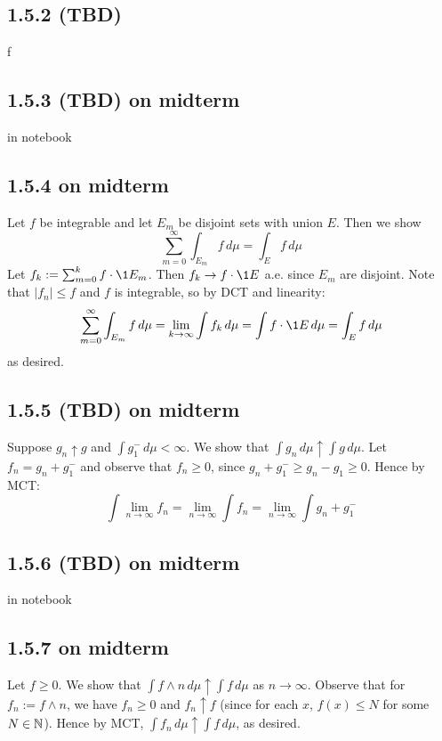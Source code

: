 \documentclass[11pt]{article}
\begin{document}
\subsection*{1.5.2 (TBD)}


f

\subsection*{1.5.3 (TBD) on midterm}


in notebook



\subsection*{1.5.4 on midterm}

Let $f$ be integrable and let $E_m$ be disjoint sets with union $E$. Then we show \[\sum_{m=0}^{\infty} \int_{E_m}f \,d\mu = \int_{E}f \,d\mu \] Let $f_k := \sum_{m=0}^{k} f\cdot \1{E_m}$. Then $f_k \to f \cdot \1{E}$ a.e. since $E_m$ are disjoint. Note that $|f_n| \leq f$ and $f$ is integrable, so by DCT and linearity: \[\sum_{m=0}^{\infty} \int_{E_m}f \,d\mu = \lim_{k\to \infty}\int f_k \,d\mu = \int f \cdot \1{E} \,d\mu=\int_{E}f \,d\mu \] as desired.

\subsection*{1.5.5 (TBD) on midterm}

Suppose $g_n \uparrow g$ and $\int g_1^- \, d\mu < \infty$. We show that $\int g_n \, d\mu \uparrow\int g \, d\mu$. Let $f_n = g_n + g_1^-$ and observe that $f_n \geq 0$, since $g_n + g_1^- \geq g_n - g_1 \geq 0$. Hence by MCT: 
\[\int \lim_{n\to\infty}  f_n = \lim_{n\to\infty} \int f_n = \lim_{n\to\infty} \int g_n + g_1^-\]

\subsection*{1.5.6 (TBD) on midterm}


in notebook



\subsection*{1.5.7 on midterm}

Let $f\geq 0$. We show that $\int f \wedge n \,d\mu \uparrow \int f \,d\mu$ as $n \to \infty$. Observe that for $f_n := f \wedge n$, we have $f_n \geq 0$ and $f_n\uparrow f$ (since for each $x$, $f(x) \leq N$ for some $N \in {\mathbb N}$). Hence by MCT, $\int f_n \,d\mu \uparrow \int f \,d\mu$, as desired. 
\end{document}
